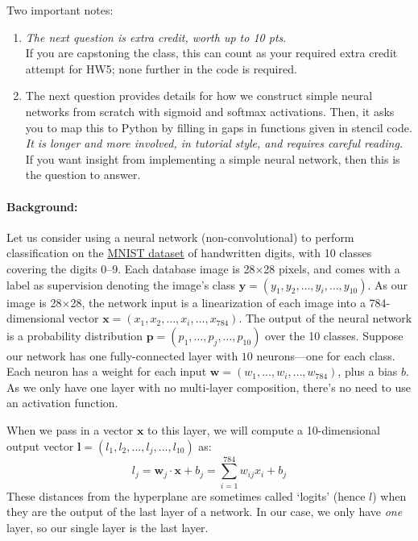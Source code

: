 \documentclass{csci1430}
\begin{document}
\begin{answer}[height=19]

\end{answer}


\pagebreak
\begin{question}[points=10,drawbox=false] 
Two important notes:
\end{question}

\begin{enumerate}
\item \emph{The next question is extra credit, worth up to 10 pts}.\\
If you are capstoning the class, this can count as your required extra credit attempt for HW5; none further in the code is required.

\item The next question provides details for how we construct simple neural networks from scratch with sigmoid and softmax activations. Then, it asks you to map this to Python by filling in gaps in functions given in stencil code. \emph{It is longer and more involved, in tutorial style, and requires careful reading.} If you want insight from implementing a simple neural network, then this is the question to answer.
\end{enumerate}

\paragraph{Background:}
Let us consider using a neural network (non-convolutional) to perform classification on the \href{http://yann.lecun.com/exdb/mnist/}{MNIST dataset} of handwritten digits, with 10 classes covering the digits 0--9. Each database image is 28$\times$28 pixels, and comes with a label as supervision denoting the image's class $\mathbf{y}=(y_1,y_2,\dots,y_i,\dots,y_{10})$. As our image is 28$\times$28, the network input is a linearization of each image into a 784-dimensional vector $\mathbf{x}=(x_1,x_2,\dots,x_i,\dots,x_{784})$. The output of the neural network is a probability distribution $\mathbf{p}=(p_1,\dots,p_j,\dots,p_{10})$ over the 10 classes. Suppose our network has one fully-connected layer with $10$ neurons---one for each class. Each neuron has a weight for each input $\mathbf{w}=(w_1,\dots,w_i,\dots,w_{784})$, plus a bias $b$. As we only have one layer with no multi-layer composition, there's no need to use an activation function.

When we pass in a vector $\mathbf{x}$ to this layer, we will compute a 10-dimensional output vector $\mathbf{l}=(l_1,l_2,...,l_j,...,l_{10})$ as:
\begin{equation}
    l_j = \mathbf{w}_j \cdot \mathbf{x} + b_j = \sum_{i=1}^{784}w_{ij}x_i + b_j
\end{equation}
These distances from the hyperplane are sometimes called `logits' (hence $l$) when they are the output of the last layer of a network. In our case, we only have \emph{one} layer, so our single layer is the last layer.
\end{document}
